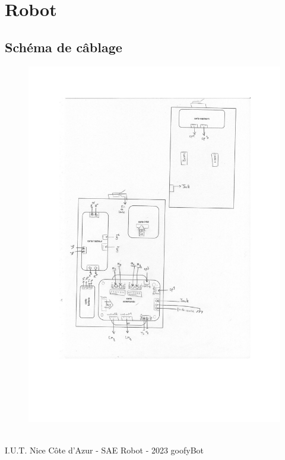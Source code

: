 \section{Robot}

\subsection{Schéma de câblage}

\begin{figure}[H]
\centering
\begin{minipage}{.5\textwidth}
  \centering
  \centerline{\includegraphics[width=1.5\linewidth]{pdf/cablages.pdf}}
  \label{fig:schcablage}
\end{minipage}%
\end{figure}

\vfill
\noindent\makebox[\linewidth]{\rule{.8\paperwidth}{.6pt}}\\[0.2cm]
I.U.T. Nice Côte d'Azur - SAE Robot - 2023 \hfill goofyBot
\noindent\makebox[\linewidth]{\rule{.8\paperwidth}{.6pt}}
\newpage

